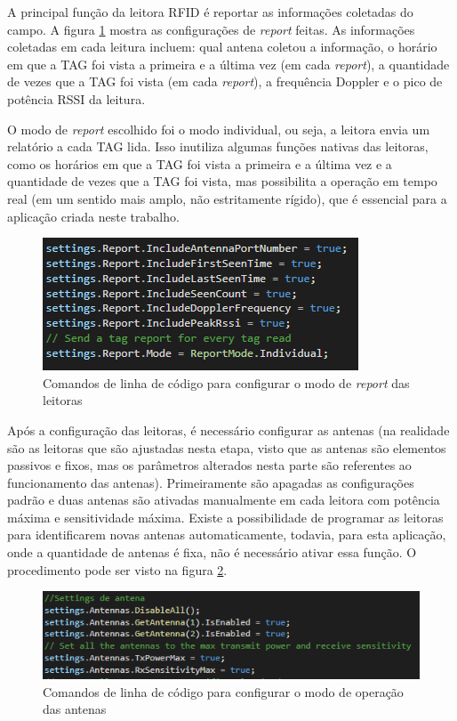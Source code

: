   A principal função da leitora RFID é reportar as informações coletadas do campo. A figura \ref{fig:report_settings} mostra as configurações de \textit{report} feitas. As informações coletadas em cada leitura incluem: qual antena coletou a informação, o horário em que a TAG foi vista a primeira e a última vez (em cada \textit{report}), a quantidade de vezes que a TAG foi vista (em cada \textit{report}), a frequência Doppler e o pico de potência RSSI da leitura. 
  
  O modo de \textit{report} escolhido foi o modo individual, ou seja, a leitora envia um relatório a cada TAG lida. Isso inutiliza algumas funções nativas das leitoras, como os horários em que a TAG foi vista a primeira e a última vez e a quantidade de vezes que a TAG foi vista, mas possibilita a operação em tempo real (em um sentido mais amplo, não estritamente rígido), que é essencial para a aplicação criada neste trabalho.

 \begin{figure}[H]
    \centering
    \includegraphics[width=0.6\linewidth]{figs/Metodologia/report_settings.PNG}
    \caption{Comandos de linha de código para configurar o modo de \textit{report} das leitoras}
    \label{fig:report_settings}
\end{figure}

 Após a configuração das leitoras, é necessário configurar as antenas (na realidade são as leitoras que são ajustadas nesta etapa, visto que as antenas são elementos passivos e fixos, mas os parâmetros alterados nesta parte são referentes ao funcionamento das antenas). Primeiramente são apagadas as configurações padrão e duas antenas são ativadas manualmente em cada leitora com potência máxima e sensitividade máxima. Existe a possibilidade de programar as leitoras para identificarem novas antenas automaticamente, todavia, para esta aplicação, onde a quantidade de antenas é fixa, não é necessário ativar essa função. O procedimento pode ser visto na figura \ref{fig:antenna_settings}.

 \begin{figure}[H]
    \centering
    \includegraphics[width=0.8\linewidth]{figs/Metodologia/antenna_settings.PNG}
    \caption{Comandos de linha de código para configurar o modo de operação das antenas}
    \label{fig:antenna_settings}
\end{figure}

